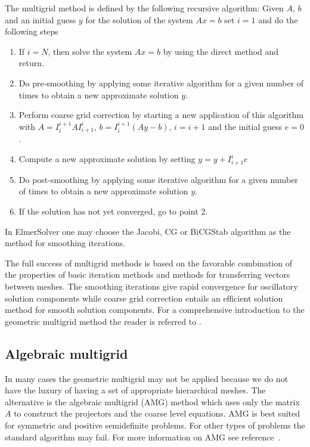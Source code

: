 \begin{versiona}
The multigrid method is defined by the following recursive algorithm: 
Given $A$, $b$ and an initial guess $y$ for the solution of the system $Ax=b$ set $i=1$ 
and do the following steps  
\begin{enumerate}
\item If $i=N$, then solve the system $Ax=b$ by using the direct method
	and return.
\item Do pre-smoothing by applying some iterative algorithm 
for a given number of times to obtain a new approximate solution $y$.
\item Perform coarse grid correction by starting 
	a new application of this algorithm with 
	$A=I_{i}^{i+1}AI_{i+1}^{i}$, $b=I_{i}^{i+1}(Ay-b)$,	
	$i=i+1$ and the initial guess $e=0$.
\item Compute a new approximate solution by setting $y = y + I_{i+1}^{i}e$
\item Do post-smoothing by applying some iterative algorithm for a given number of times
	to obtain a new approximate solution $y$.
\item If the solution has not yet converged, go to point 2.
\end{enumerate}
In ElmerSolver one may choose the Jacobi, CG or BiCGStab algorithm as the method for smoothing
iterations. 

The full success of multigrid methods is based on the favorable combination of the properties 
of basic iteration methods and methods for transferring vectors between meshes. 
The smoothing iterations give rapid convergence for    
oscillatory solution components while coarse grid correction entails an efficient 
solution method for smooth solution components. For a comprehensive 
introduction to the geometric multigrid method the reader is referred to \cite{Briggs87}.     





\subsection{Algebraic multigrid}

In many cases the geometric multigrid may not be applied because we do not have the 
luxury of having a set of appropriate hierarchical meshes. The alternative is the 
algebraic multigrid (AMG) method which uses only the matrix $A$ to construct the projectors and the 
coarse level equations. AMG is best suited for symmetric and positive semidefinite problems.
For other types of problems the standard algorithm may fail. For more information on 
AMG see reference~\cite{stuben99}. 
 

\end{versiona}
